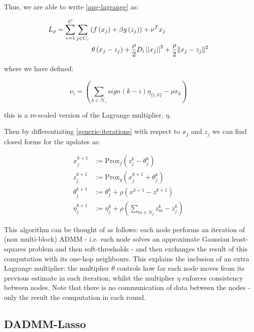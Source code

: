 Thus, we are able to write \eqref{aug-lagrange} as:

\begin{align}
L_\rho = \sum_{c=1}^C\sum_{j \in C_c} &\left( f\left(x_j\right) + \beta g\left(z_j\right)\right) + \nu^Tx_j \nonumber \\
& \text{        } \theta\left(x_j - z_j\right) + \frac{\rho}{2}D_i\left|\left|x_j\right|\right|^2 + \frac{\rho }{2}\|x_j-z_j\|^2
\label{generic-iterations}
\end{align}

where we have defined:

\begin{equation}
\nu_i = \left(\sum_{k \in \mathcal{N}_i} sign\left(k-i\right)\eta_{\{i,k\}} - \rho x_k \right)
\end{equation}

this is a re-scaled version of the Lagrange multiplier, \(\eta\). 

Then by differentiating \eqref{generic-iterations} with respect to \(x_j\) and \(z_j\) we  can find closed forms for the updates as:

\begin{theorem}
\begin{align}
x_j^{k+1} &:= \mathrm{Prox}_f \left( z_j^k - \theta_j^k\right)\\
z_j^{k+1} &:= \mathrm{Prox}_g \left( x_j^{k+1} + \theta_j^k\right)
 \\
\theta_j^{k+1} &:= \theta_j^{k} + \rho \left(x^{k+1}-z^{k+1}\right) \\
\eta_j^{k+1} &:= \eta_j^k + \rho\left(\sum_{m \in N_j} z_m^k - z_j^k\right)
\label{dadmm_algo}
\end{align}
\end{theorem}

This algorithm can be thought of as follows: each node performs an iteration of (non multi-block) ADMM - i.e. each node solves an approximate Gaussian least-squares problem and then soft-thresholds - and then exchanges the result of this computation with its one-hop neighbours. This explains the inclusion of an extra Lagrange multiplier: the multiplier \(\theta\) controls how far each node moves from its previous estimate in each iteration, whilst the multiplier \(\eta\) enforces consistency between nodes. Note that there is no communication of data between the nodes - only the result the computation in each round.

\subsection{DADMM-Lasso}\label{sec:lasso-algo}

